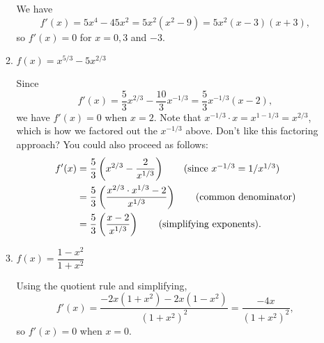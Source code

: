 \documentclass[12pt]{article}
\begin{document}
\begin{enumerate}
\begin{enumerate}
    We have
    \[
    f'(x) = 5x^4-45x^2=5x^2(x^2-9)=5x^2(x-3)(x+3),
    \]
    so $f'(x)=0$ for $x=0, 3$ and $-3$.
    
    \item $f(x) = x^{5/3}-5x^{2/3}$
    
    Since
    \[
    f'(x) = \frac53 x^{2/3}-\frac{10}{3}x^{-1/3} = \frac53 x^{-1/3}(x-2),
    \]
    we have $f'(x)=0$ when $x=2$. Note that $x^{-1/3}\cdot x = x^{1-1/3}=x^{2/3}$, which is how we factored out the $x^{-1/3}$ above. Don't like this factoring approach? You could also proceed as follows:
    \begin{align*}
    f'(x) &= \frac53\left(x^{2/3}-\frac{2}{x^{1/3}}\right) \tag{since $x^{-1/3}=1/x^{1/3}$}\\
    & = \frac53\left(\frac{x^{2/3}\cdot x^{1/3}-2}{x^{1/3}}\right) \tag{common denominator}\\
    & = \frac53\left(\frac{x-2}{x^{1/3}}\right) \tag{simplifying exponents}.
    \end{align*}
    
    
    \item $f(x) = \dfrac{1-x^2}{1+x^2}$
    
    Using the quotient rule and simplifying,
    \[
    f'(x) = \frac{-2x(1+x^2)-2x(1-x^2)}{(1+x^2)^2}=\frac{-4x}{(1+x^2)^2},
    \]
    so $f'(x)=0$ when $x=0$.
    \end{enumerate}
    
    
  \end{enumerate}
\end{document}
